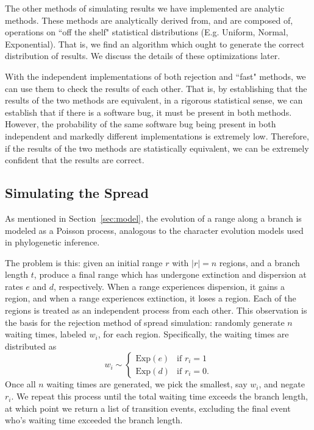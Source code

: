 \documentclass[a4paper]{article}
\begin{document}
The other methods of simulating results we have implemented are analytic
methods.
These methods are analytically derived from, and are composed of, operations on
``off the shelf" statistical distributions (E.g. Uniform, Normal, Exponential).
That is, we find an algorithm which ought to generate the correct distribution
of results.
We discuss the details of these optimizations later.

With the independent implementations of both rejection and ``fast" methods, we
can use them to check the results of each other.
That is, by establishing that the results of the two methods are equivalent, in
a rigorous statistical sense, we can establish that if there is a software bug,
it must be present in both methods.
However, the probability of the same software bug being present in both
independent and markedly different implementations is extremely low.
Therefore, if the results of the two methods are statistically equivalent, we
can be extremely confident that the results are correct.

\subsection{Simulating the Spread}

As mentioned in Section~\ref{sec:model}, the evolution of a range along a
branch is modeled as a Poisson process, analogous to the character evolution
models used in phylogenetic inference.

The problem is this: given an initial range \( r \) with \( |r| = n \) regions,
and a branch length \( t \), produce a final range which has undergone
extinction and dispersion at rates \( e \) and \( d \), respectively.
When a range experiences dispersion, it gains a region, and when a range
experiences extinction, it loses a region. 
Each of the regions is treated as an independent process from each other.
This observation is the basis for the rejection method of spread simulation:
randomly generate \( n \) waiting times, labeled \( w_i \), for each region.
Specifically, the waiting times are distributed as
\begin{equation}
	\label{eq:exp-rejection} w_i \sim
	\begin{cases}
		\text{Exp}(e) & \text{if } r_i
		= 1                            \\ \text{Exp}(d) & \text{if } r_i = 0.
	\end{cases}
\end{equation}
Once all $n$ waiting times are generated, we pick the smallest, say $w_i$, and
negate $r_i$.
We repeat this process until the total waiting time exceeds the branch length,
at which point we return a list of transition events, excluding the final event
who's waiting time exceeded the branch length.
\end{document}
